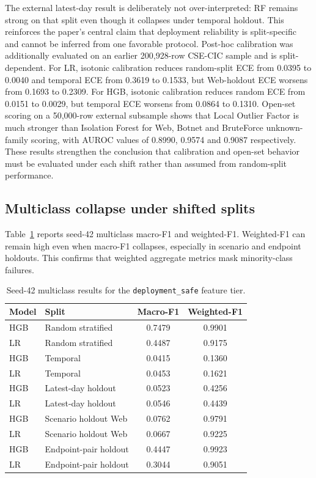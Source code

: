 \documentclass[11pt,a4paper]{article}
\begin{document}
The external latest-day result is deliberately not over-interpreted: RF remains strong on that split even though it collapses under temporal holdout. This reinforces the paper's central claim that deployment reliability is split-specific and cannot be inferred from one favorable protocol. Post-hoc calibration was additionally evaluated on an earlier 200,928-row CSE-CIC sample and is split-dependent. For LR, isotonic calibration reduces random-split ECE from 0.0395 to 0.0040 and temporal ECE from 0.3619 to 0.1533, but Web-holdout ECE worsens from 0.1693 to 0.2309. For HGB, isotonic calibration reduces random ECE from 0.0151 to 0.0029, but temporal ECE worsens from 0.0864 to 0.1310. Open-set scoring on a 50,000-row external subsample shows that Local Outlier Factor is much stronger than Isolation Forest for Web, Botnet and BruteForce unknown-family scoring, with AUROC values of 0.8990, 0.9574 and 0.9087 respectively. These results strengthen the conclusion that calibration and open-set behavior must be evaluated under each shift rather than assumed from random-split performance.

\subsection{Multiclass collapse under shifted splits}

Table~\ref{tab:multiclass} reports seed-42 multiclass macro-F1 and weighted-F1. Weighted-F1 can remain high even when macro-F1 collapses, especially in scenario and endpoint holdouts. This confirms that weighted aggregate metrics mask minority-class failures.

\begin{table}[ht]
\centering
\caption{Seed-42 multiclass results for the \texttt{deployment\_safe} feature tier.}
\label{tab:multiclass}
\begin{tabular}{llcc}
\toprule
Model & Split & Macro-F1 & Weighted-F1 \\
\midrule
HGB & Random stratified & 0.7479 & 0.9901 \\
LR & Random stratified & 0.4487 & 0.9175 \\
HGB & Temporal & 0.0415 & 0.1360 \\
LR & Temporal & 0.0453 & 0.1621 \\
HGB & Latest-day holdout & 0.0523 & 0.4256 \\
LR & Latest-day holdout & 0.0546 & 0.4439 \\
HGB & Scenario holdout Web & 0.0762 & 0.9791 \\
LR & Scenario holdout Web & 0.0667 & 0.9225 \\
HGB & Endpoint-pair holdout & 0.4447 & 0.9923 \\
LR & Endpoint-pair holdout & 0.3044 & 0.9051 \\
\bottomrule
\end{tabular}
\end{table}
\end{document}
